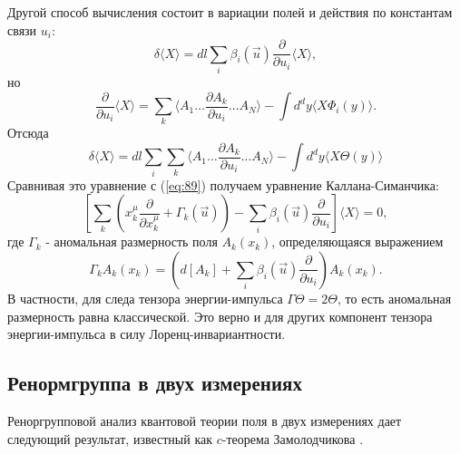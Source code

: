 \documentclass[a4paper,12pt]{article}
\theoremstyle{definition}
\theoremstyle{definition}
\theoremstyle{definition}
\begin{document}
Другой способ вычисления состоит в вариации полей и действия по константам связи $u_i$:
\begin{equation}
  \label{eq:90}
  \delta\langle X\rangle=dl\sum_i \beta_i(\vec u)\frac{\partial}{\partial u_i}\langle X\rangle,
\end{equation}
но
\begin{equation}
  \label{eq:91}
  \frac{\partial}{\partial u_i}\langle X\rangle=\sum_k \langle A_1\dots \frac{\partial A_k}{\partial u_i}\dots A_N\rangle-\int d^d y \langle X \Phi_i(y)\rangle.
\end{equation}
Отсюда
\begin{equation}
  \label{eq:92}
  \delta\langle X\rangle=dl \sum_i \sum_k\langle A_1\dots \frac{\partial A_k}{\partial u_i}\dots A_N\rangle-\int d^d y \langle X \Theta(y)\rangle
\end{equation}
Сравнивая это уравнение с (\ref{eq:89}) получаем уравнение Каллана-Симанчика:
\begin{equation}
  \label{eq:93}
  \left[ \sum_k\left( x^{\mu}_k \frac{\partial}{\partial x^{\mu}_k}+\Gamma_k(\vec u)\right) -\sum_i \beta_i(\vec u)\frac{\partial }{\partial u_i}\right]\langle X\rangle=0,
\end{equation}
где $\Gamma_k$ - аномальная размерность поля $A_k(x_k)$, определяющаяся выражением
\begin{equation}
  \label{eq:94}
  \Gamma_k A_k(x_k)=\left( d[A_k]+\sum_i \beta_i(\vec u) \frac{\partial }{\partial u_i}\right) A_k(x_k).
\end{equation}
В частности, для следа тензора энергии-импульса $\Gamma \Theta=2 \Theta$, то есть аномальная размерность равна классической. Это верно и для других компонент тензора энергии-импульса в силу Лоренц-инвариантности.

\subsection{Ренормгруппа в двух измерениях}
\label{sec:renormgroup-in-2d}

Реноргрупповой анализ квантовой теории поля в двух измерениях дает следующий результат, известный как $c$-теорема Замолодчикова \cite{zamolodchikov1986irreversibility}.
\end{document}
